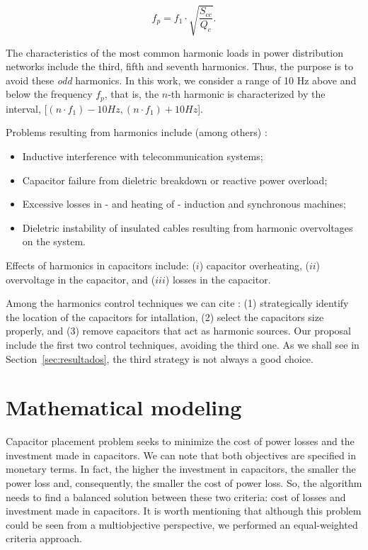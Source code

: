 \documentclass[11pt]{article}
\begin{document}
\begin{equation}
f_p = f_1\cdot \sqrt{\frac{S_{cc}}{Q_c}}.
\label{eq:freq_harm_2}
\end{equation}

The characteristics of the most common harmonic loads in power distribution networks 
include the third, fifth and seventh harmonics. Thus, the purpose is to avoid 
these \emph{odd} harmonics. In this work, we consider a range of 10 Hz above and
below the frequency $f_p$, that is, the $n$-th harmonic is characterized by the interval, 
[$(n\cdot f_1)-10 Hz, (n\cdot f_1)+10 Hz$].

Problems resulting from harmonics include (among others) \citep{Mahmoud1983}:

\begin{itemize}
	\item Inductive interference with telecommunication systems;
	\item Capacitor failure from dieletric breakdown or reactive power overload;
	\item Excessive losses in - and heating of - induction and synchronous machines;
	\item Dieletric instability of insulated cables resulting from harmonic overvoltages
		on the system.
\end{itemize}

Effects of harmonics in capacitors include: ($i$) capacitor overheating, ($ii$)
overvoltage in the capacitor, and ($iii$) losses in the capacitor.

Among the harmonics control techniques we can cite \citep{Gonen1986}: (1) strategically identify 
the location of the capacitors for intallation, (2) select the capacitors size properly, and 
(3) remove capacitors that act as harmonic sources. Our proposal include
the first two control techniques, avoiding the third one. As we shall see in 
Section~\ref{sec:resultados}, the third strategy is not always a good choice.

\section{Mathematical modeling}
\label{sec:modelagem}

Capacitor placement problem seeks to minimize the cost of power losses 
and the investment made in capacitors. We can note that both objectives
are specified in monetary terms. In fact, the higher the investment in
capacitors, the smaller the power loss and, consequently, the smaller the 
cost of power loss. So, the algorithm needs to find a balanced solution between
these two criteria: cost of losses and investment made in capacitors.
It is worth mentioning that although this problem could be seen from a multiobjective 
perspective, we performed an equal-weighted criteria approach.
\end{document}

